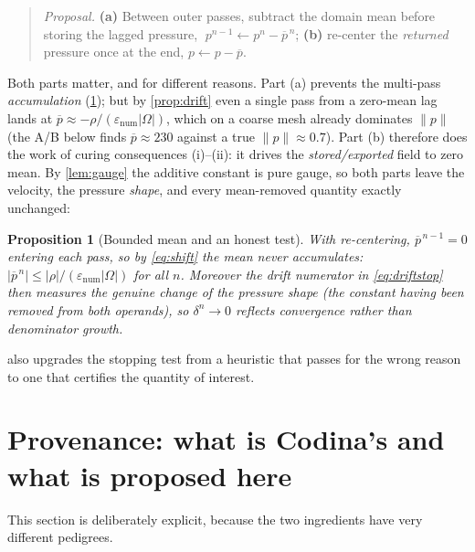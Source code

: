 \documentclass[11pt]{article}
\theoremstyle{plain}
\newtheorem{proposition}{Proposition}
\theoremstyle{remark}
\newcommand{\meas}{\lvert\Omega\rvert}
\newcommand{\enum}{\varepsilon_{\mathrm{num}}}
\newcommand{\pbar}{\overline{p}}
\newcommand{\norm}[1]{\lVert #1\rVert}
\newcommand{\abs}[1]{\left\lvert #1\right\rvert}
\begin{document}
\begin{quote}
\emph{Proposal.} \textbf{(a)} Between outer passes, subtract the domain mean before storing the lagged
pressure, $\;p^{n-1}\leftarrow p^{n}-\pbar^{\,n}$; \textbf{(b)} re-center the \emph{returned} pressure
once at the end, $p\leftarrow p-\pbar$.
\end{quote}

Both parts matter, and for different reasons. Part (a) prevents the multi-pass \emph{accumulation}
(\cref{prop:bounded}); but by \cref{prop:drift} even a single pass from a zero-mean lag lands at
$\pbar\approx-\rho/(\enum\meas)$, which on a coarse mesh already dominates $\norm{p}$ (the A/B below finds
$\pbar\approx230$ against a true $\norm{p}\approx0.7$). Part (b) therefore does the work of curing
consequences (i)--(ii): it drives the \emph{stored/exported} field to zero mean. By \cref{lem:gauge} the
additive constant is pure gauge, so both parts leave the velocity, the pressure \emph{shape}, and every
mean-removed quantity exactly unchanged:

\begin{proposition}[Bounded mean and an honest test]
\label{prop:bounded}
With re-centering, $\pbar^{\,n-1}=0$ entering each pass, so by \eqref{eq:shift} the mean never
accumulates: $\abs{\pbar^{\,n}}\le\abs{\rho}/(\enum\meas)$ for all $n$. Moreover the drift numerator in
\eqref{eq:driftstop} then measures the genuine change of the pressure \emph{shape} (the constant having
been removed from both operands), so $\delta^{n}\to0$ reflects convergence rather than denominator
growth.
\end{proposition}

 also upgrades the stopping test from a heuristic that passes for the wrong reason to
one that certifies the quantity of interest.

\section{Provenance: what is Codina's and what is proposed here}
\label{sec:provenance}

This section is deliberately explicit, because the two ingredients have very different pedigrees.
\end{document}
